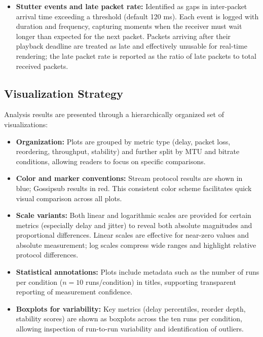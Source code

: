 \begin{itemize}
    \item \textbf{Stutter events and late packet rate:} Identified as gaps in inter-packet arrival time exceeding a threshold (default 120 ms). Each event is logged with duration and frequency, capturing moments when the receiver must wait longer than expected for the next packet. Packets arriving after their playback deadline are treated as late and effectively unusable for real-time rendering; the late packet rate is reported as the ratio of late packets to total received packets.
\end{itemize}

\subsection{Visualization Strategy}
Analysis results are presented through a hierarchically organized set of visualizations:

\begin{itemize}
    \item \textbf{Organization:} Plots are grouped by metric type (delay, packet loss, reordering, throughput, stability) and further split by \ac{MTU} and bitrate conditions, allowing readers to focus on specific comparisons.
    
    \item \textbf{Color and marker conventions:} Stream protocol results are shown in blue; Gossipsub results in red. This consistent color scheme facilitates quick visual comparison across all plots.
    
    \item \textbf{Scale variants:} Both linear and logarithmic scales are provided for certain metrics (especially delay and jitter) to reveal both absolute magnitudes and proportional differences. Linear scales are effective for near-zero values and absolute measurement; log scales compress wide ranges and highlight relative protocol differences.
    
    \item \textbf{Statistical annotations:} Plots include metadata such as the number of runs per condition ($n = 10$ runs/condition) in titles, supporting transparent reporting of measurement confidence.
    
    \item \textbf{Boxplots for variability:} Key metrics (delay percentiles, reorder depth, stability scores) are shown as boxplots across the ten runs per condition, allowing inspection of run-to-run variability and identification of outliers.
\end{itemize}


